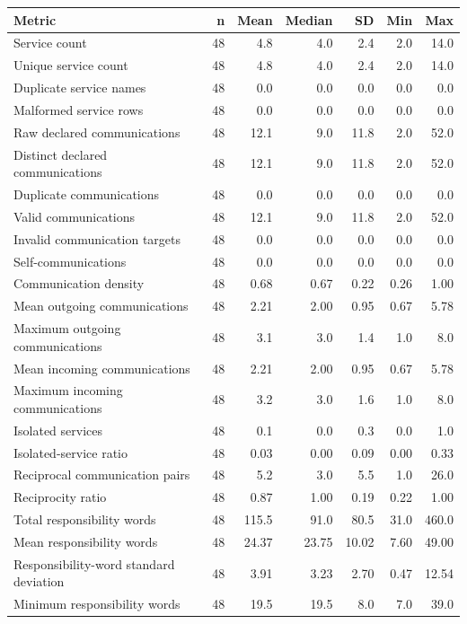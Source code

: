 \begin{table}[t]
\centering
\small
\begin{tabular}{lrrrrrr}
\toprule
Metric & n & Mean & Median & SD & Min & Max \\
\midrule
Service count & 48 & 4.8 & 4.0 & 2.4 & 2.0 & 14.0 \\
Unique service count & 48 & 4.8 & 4.0 & 2.4 & 2.0 & 14.0 \\
Duplicate service names & 48 & 0.0 & 0.0 & 0.0 & 0.0 & 0.0 \\
Malformed service rows & 48 & 0.0 & 0.0 & 0.0 & 0.0 & 0.0 \\
Raw declared communications & 48 & 12.1 & 9.0 & 11.8 & 2.0 & 52.0 \\
Distinct declared communications & 48 & 12.1 & 9.0 & 11.8 & 2.0 & 52.0 \\
Duplicate communications & 48 & 0.0 & 0.0 & 0.0 & 0.0 & 0.0 \\
Valid communications & 48 & 12.1 & 9.0 & 11.8 & 2.0 & 52.0 \\
Invalid communication targets & 48 & 0.0 & 0.0 & 0.0 & 0.0 & 0.0 \\
Self-communications & 48 & 0.0 & 0.0 & 0.0 & 0.0 & 0.0 \\
Communication density & 48 & 0.68 & 0.67 & 0.22 & 0.26 & 1.00 \\
Mean outgoing communications & 48 & 2.21 & 2.00 & 0.95 & 0.67 & 5.78 \\
Maximum outgoing communications & 48 & 3.1 & 3.0 & 1.4 & 1.0 & 8.0 \\
Mean incoming communications & 48 & 2.21 & 2.00 & 0.95 & 0.67 & 5.78 \\
Maximum incoming communications & 48 & 3.2 & 3.0 & 1.6 & 1.0 & 8.0 \\
Isolated services & 48 & 0.1 & 0.0 & 0.3 & 0.0 & 1.0 \\
Isolated-service ratio & 48 & 0.03 & 0.00 & 0.09 & 0.00 & 0.33 \\
Reciprocal communication pairs & 48 & 5.2 & 3.0 & 5.5 & 1.0 & 26.0 \\
Reciprocity ratio & 48 & 0.87 & 1.00 & 0.19 & 0.22 & 1.00 \\
Total responsibility words & 48 & 115.5 & 91.0 & 80.5 & 31.0 & 460.0 \\
Mean responsibility words & 48 & 24.37 & 23.75 & 10.02 & 7.60 & 49.00 \\
Responsibility-word standard deviation & 48 & 3.91 & 3.23 & 2.70 & 0.47 & 12.54 \\
Minimum responsibility words & 48 & 19.5 & 19.5 & 8.0 & 7.0 & 39.0 \\

\end{tabular}
\end{table}
